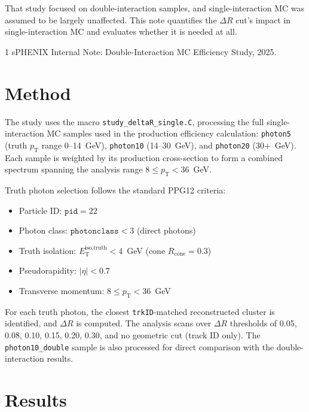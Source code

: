 \documentclass[11pt,letterpaper]{article}
\newcommand{\DR}{\ensuremath{\Delta R}}
\newcommand{\pT}{\ensuremath{p_{\text{T}}}}
\newcommand{\Rcone}{\ensuremath{R_{\text{cone}}}}
\newcommand{\abseta}{\ensuremath{|\eta|}}
\newcommand{\isoETtruth}{\ensuremath{E_\text{T}^\text{iso,truth}}}
\begin{document}
That study focused on double-interaction samples, and single-interaction MC was
assumed to be largely unaffected. This note quantifies the $\DR$ cut's impact
in single-interaction MC and evaluates whether it is needed at all.

\begin{thebibliography}{1}
 sPHENIX Internal Note: Double-Interaction MC Efficiency
  Study, 2025.
\end{thebibliography}

\section{Method}
\label{sec:method}

The study uses the macro \texttt{study\_deltaR\_single.C}, processing the full
single-interaction MC samples used in the production efficiency calculation:
\texttt{photon5} (truth $\pT$ range 0--14~GeV), \texttt{photon10} (14--30~GeV),
and \texttt{photon20} (30+~GeV). Each sample is weighted by its production
cross-section to form a combined spectrum spanning the analysis range
$8 \leq \pT < 36$~GeV.

Truth photon selection follows the standard PPG12 criteria:
\begin{itemize}
  \item Particle ID: $\texttt{pid} = 22$
  \item Photon class: $\texttt{photonclass} < 3$ (direct photons)
  \item Truth isolation: $\isoETtruth < 4$~GeV (cone $\Rcone = 0.3$)
  \item Pseudorapidity: $\abseta < 0.7$
  \item Transverse momentum: $8 \leq \pT < 36$~GeV
\end{itemize}

For each truth photon, the closest \texttt{trkID}-matched reconstructed cluster
is identified, and $\DR$ is computed. The analysis scans over $\DR$ thresholds
of 0.05, 0.08, 0.10, 0.15, 0.20, 0.30, and no geometric cut (track ID only).
The \texttt{photon10\_double} sample is also processed for direct comparison
with the double-interaction results.

\section{Results}
\label{sec:results}
\end{document}
